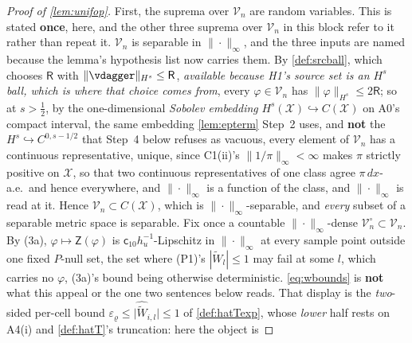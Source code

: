 \begin{proof}[Proof of \cref{lem:unifop}]
First, the suprema over $\mathcal V_n$ are random variables. This is stated \textbf{once}, here, and
the other three suprema over $\mathcal V_n$ in this block refer to it rather than repeat it.
$\mathcal V_n$ is separable in $\|\cdot\|_\infty$, and the three inputs are named because the lemma's
hypothesis list now carries them. By \cref{def:srcball}, which chooses $\mathsf R$
with $\|\vdagger\|_{H^{s}}\le\mathsf R$, \emph{available because H1's source set is an $H^{s}$ ball, which
is where that choice comes from}, every $\varphi\in\mathcal V_n$ has $\|\varphi\|_{H^{s}}\le2\mathsf R$;
so at $s>\tfrac12$, by the one-dimensional \emph{Sobolev embedding}
$H^{s}(\mathcal X)\hookrightarrow C(\mathcal X)$ on A0's compact interval, the same embedding
\cref{lem:epterm} Step~2 uses, and \textbf{not} the $H^{s}\hookrightarrow C^{0,s-1/2}$ that Step~4 below
refuses as vacuous, every element of $\mathcal V_n$ has a continuous
representative, unique, since C1(ii)'s $\|1/\pi\|_\infty<\infty$ makes $\pi$ strictly positive on
$\mathcal X$, so that two continuous representatives of one class agree $\pi\,dx$-a.e.\ and hence
everywhere, and $\|\cdot\|_\infty$ is a function of the class, and $\|\cdot\|_\infty$ is read at it. Hence $\mathcal V_n\subset C(\mathcal X)$, which is
$\|\cdot\|_\infty$-separable, and \emph{every} subset of a separable metric space is separable. Fix once a
countable $\|\cdot\|_\infty$-dense $\mathcal V_n^{\circ}\subset\mathcal V_n$. By (3a),
$\varphi\mapsto\mathsf Z(\varphi)$
is $\mathsf c_{10}h_u^{-1}$-Lipschitz in $\|\cdot\|_\infty$ at every sample point outside one fixed $P$-null
set, the set where \textup{(P1)}'s $|\widetilde W_l|\le1$ may fail at some $l$, which carries no
$\varphi$, (3a)'s
bound being otherwise deterministic.
\eqref{eq:wbounds} is \textbf{not} what this appeal or the one two sentences below reads. That
display is the \emph{two}-sided per-cell bound
$\varepsilon_\varrho\le\big|\widehat{\widetilde W}_{i,l}\big|\le1$ of \cref{def:hatTexp}, whose \emph{lower} half rests
on A4(i) and \cref{def:hatT}'s truncation: here the object is

\end{proof}
